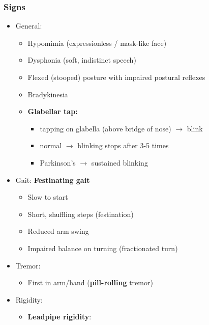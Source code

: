 \documentclass[
  12pt,
]{memoir}
\providecommand{\tightlist}{%
  \setlength{\itemsep}{0pt}\setlength{\parskip}{0pt}}
\begin{document}
\hypertarget{signs}{%
\subsubsection{Signs}\label{signs}}

\begin{itemize}
\tightlist
\item
  General:

  \begin{itemize}
  \tightlist
  \item
    Hypomimia (expressionless / mask-like face)
  \item
    Dysphonia (soft, indistinct speech)
  \item
    Flexed (stooped) posture with impaired postural reflexes
  \item
    Bradykinesia
  \item
    \textbf{Glabellar tap:}

    \begin{itemize}
    \tightlist
    \item
      tapping on glabella (above bridge of nose) \(\rightarrow\) blink
    \item
      normal \(\rightarrow\) blinking stops after 3-5 times
    \item
      Parkinson's \(\rightarrow\) sustained blinking
    \end{itemize}
  \end{itemize}
\item
  Gait: \textbf{Festinating gait}

  \begin{itemize}
  \tightlist
  \item
    Slow to start
  \item
    Short, shuffling steps (festination)
  \item
    Reduced arm swing
  \item
    Impaired balance on turning (fractionated turn)
  \end{itemize}
\item
  Tremor:

  \begin{itemize}
  \tightlist
  \item
    First in arm/hand (\textbf{pill-rolling} tremor)
  \end{itemize}
\item
  Rigidity:

  \begin{itemize}
  \tightlist
  \item
    \textbf{Leadpipe rigidity}:


\end{itemize}
\end{itemize}
\end{document}
